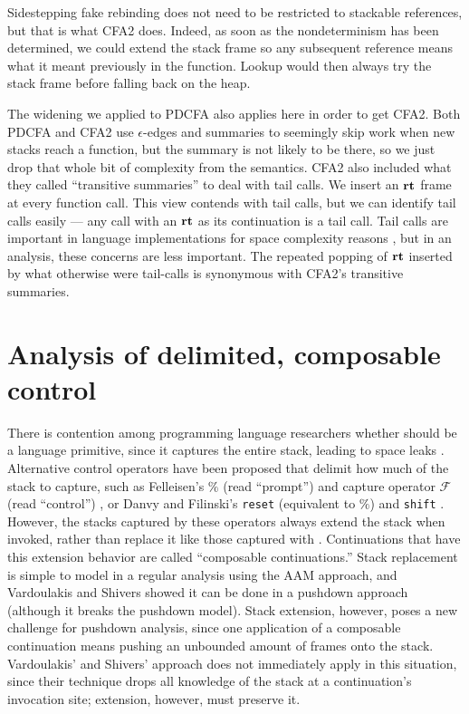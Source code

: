 \documentclass{llncs}
\newcommand{\Scribtexttt}[1]{{\texttt{#1}}}
\newcommand{\SColorize}[2]{\color{#1}{#2}}
\newcommand{\inColor}[2]{{\Scribtexttt{\SColorize{#1}{#2}}}}
\newcommand{\rackett}[1]{\inColor{black}{#1}}
\begin{document}
Sidestepping fake rebinding does not need to be restricted to
stackable references, but that is what CFA2 does. Indeed, as soon as
the nondeterminism has been determined, we could extend the stack
frame so any subsequent reference means what it meant previously in
the function. Lookup would then always try the stack frame before
falling back on the heap.

The widening we applied to PDCFA also applies here in order to get
CFA2. Both PDCFA and CFA2 use $\epsilon$-edges and summaries to
seemingly skip work when new stacks reach a function, but the summary
is not likely to be there, so we just drop that whole bit of
complexity from the semantics. CFA2 also included what they called
``transitive summaries'' to deal with tail calls. We insert an $\mathbf{rt}$
frame at every function call.  This view contends with tail calls, but
we can identify tail calls easily --- any call with an $\mathbf{rt}$ as its
continuation is a tail call. Tail calls are important in language
implementations for space complexity reasons
\citep{ianjohnson:clinger:tail-calls:1998}, but in an analysis, these
concerns are less important. The repeated popping of $\mathbf{rt}$ inserted
by what otherwise were tail-calls is synonymous with CFA2's transitive
summaries.

\section{Analysis of delimited, composable control}
\label{sec:sr}

There is contention among programming language researchers whether
\rackett{call/cc} should be a language primitive, since it captures
the entire stack, leading to space leaks
\citep{ianjohnson:kiselyov:against-callcc}. Alternative control
operators have been proposed that delimit how much of the stack to
capture, such as Felleisen's $\%$ (read ``prompt'') and capture
operator ${\mathcal F}$ (read ``control'')
\citep{ianjohnson:felleisen:control:1988}, or Danvy and Filinski's
\texttt{reset} (equivalent to $\%$) and \texttt{shift}
\citep{ianjohnson:danvy:filinski:delim:1990}. However, the stacks
captured by these operators always extend the stack when invoked,
rather than replace it like those captured with
\rackett{call/cc}. Continuations that have this extension behavior are
called ``composable continuations.'' Stack replacement is simple to
model in a regular analysis using the AAM approach, and Vardoulakis
and Shivers showed it can be done in a pushdown approach (although it
breaks the pushdown model). Stack extension, however, poses a new
challenge for pushdown analysis, since one application of a composable
continuation means pushing an unbounded amount of frames onto the
stack. Vardoulakis' and Shivers' approach does not immediately apply
in this situation, since their technique drops all knowledge of the
stack at a continuation's invocation site; extension, however, must
preserve it.
\end{document}

